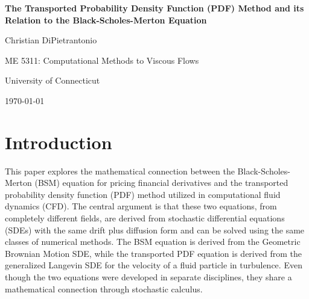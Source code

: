 \documentclass[12pt, onecolumn, journal]{IEEEtran}
\begin{document}

\begin{titlepage}
    \centering
    \vspace*{50pt}
    {\Large \textbf{The Transported Probability Density Function (PDF) Method and its Relation to the Black-Scholes-Merton Equation} \par}
    \vspace{25pt}
    {\Large Christian DiPietrantonio \par}
    \vfill
    {\large ME 5311: Computational Methods to Viscous Flows \par}
    {\large University of Connecticut \par}
    {\large \today \par}
    \vspace{50pt}
\end{titlepage}

\tableofcontents
\newpage
{}

\section{Introduction}
This paper explores the mathematical connection between the Black-Scholes-Merton (BSM) equation for pricing financial derivatives and the transported probability density function (PDF) method utilized in computational fluid dynamics (CFD). The central argument is that these two equations, from completely different fields, are derived from stochastic differential equations (SDEs) with the same drift plus diffusion form and can be solved using the same classes of numerical methods. The BSM equation is derived from the Geometric Brownian Motion SDE, while the transported PDF equation is derived from the generalized Langevin SDE for the velocity of a fluid particle in turbulence. Even though the two equations were developed in separate disciplines, they share a mathematical connection through stochastic calculus.
\end{document}
